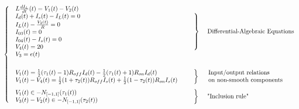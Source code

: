 \begin{equation}
  \label{eq:72}
 \left\{ \begin{array}{l l l}
    \begin{array}{l}
      L  \frac{dI_L}{dt}(t) = V_1(t)-V_2(t) \\
      I_d(t)+I_s(t)-I_L(t)=0 \\
      I_L(t)-\frac{V_2(t)}{R}=0\\
      I_{03}(t)=0\\
      I_{04}(t)-I_{s}(t)=0\\
      V_4(t)=20\\
      V_3=e(t)\\
\end{array}
& \left.\begin{array}{l}
      \\
      \\ \\ \\ \\
\end{array}\right\}& \text{ Differential-Algebraic Equations}\\ \\[2mm]
  \begin{array}{l}
V_{1}(t)=\frac{1}{2}(\tau_{1}(t)-1)R_{off} I_{d}(t)-\frac{1}{2}(\tau_{1}(t)+1) R_{on} I_{d}(t) \\ 
V_{1}(t)-V_{4}(t)=\frac{1}{2}(1+\tau_{2}(t)) R_{off} I_{s}(t)+\frac{1}{2}(1-\tau_{2}(t)) R_{on} I_{s}(t)
  \end{array} & \left.\begin{array}{c}
     \\ \\
  \end{array}\right\} & \begin{array}{l}
   \text{Input/output relations }\\
   \text{on non-smooth components}
  \end{array}  \\  [5mm]
  \begin{array}{l}
  V_{1}(t) \in - N_{[-1,1]}(\tau_{1}(t)) \\   V_{3}(t)-V_{2}(t) \in -N_{[-1,1]}(\tau_{2}(t))
\end{array} 
& \left.\begin{array}{c} \\ \\ \end{array}\right\}  &  \text{ "Inclusion rule"}\\ 
\end{array}\right.
\end{equation}

